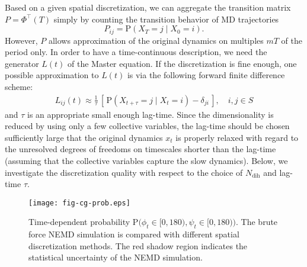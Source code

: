 \documentclass[journal=jctcce,manuscript=article]{achemso}
\newcommand{\vect}[1]{#1}
\newcommand{\myphi}{\Phi}
\newcommand{\prob}{\textrm{P}}
\newcommand{\dih}{\textrm{dih}}
\begin{document}
Based on a given spatial discretization, we can aggregate the transition matrix $\vect P=\myphi^{\top}(T)$ simply by counting the transition behavior of MD trajectories 
\begin{equation}\label{Pdirect}
\vect P_{ij}=\prob\left(\vect X_T=j\mid \vect X_0=i \right).
\end{equation}
However, $\vect P$ allows approximation of the original dynamics on multiples $mT$ of the period only. In order to have a time-continuous description, we need the generator $L(t)$ of the Master equation. 
If the discretization is fine enough, one possible approximation to $L(t)$ is via
the following forward finite difference scheme:
\begin{align}
  \label{eqn:tmp4}
  L_{ij}(t) \approx \frac{1}{\tau}
  \,[\, \prob (\vect X_{t+\tau} = j \mid \vect X_{t} = i) - \delta_{ji} \,],
  \quad i,j\in S
\end{align}
and $\tau$ is an appropriate small enough lag-time.
  Since the dimensionality is reduced by using only a few collective
  variables, the lag-time should be chosen sufficiently large that
  the original dynamics $x_t$ is properly relaxed with regard to
  the unresolved degrees of freedoms on timescales shorter than the lag-time
  (assuming  that the collective variables capture the slow dynamics).
  Below, 
we investigate the discretization
quality with respect to  the choice of $N_\dih$ and  lag-time $\tau$.

%



\begin{figure}
  \centering
  \texttt{[image: fig-cg-prob.eps]}  
  \caption{Time-dependent probability $\prob\big(\phi_t\in[0,180), \psi_t\in [0,180)\big)$.  The brute force NEMD simulation is compared with different
    spatial discretization methods. The red shadow region indicates the
    statistical uncertainty of the NEMD simulation.}
  \label{fig:tmp2}
\end{figure}
\end{document}

